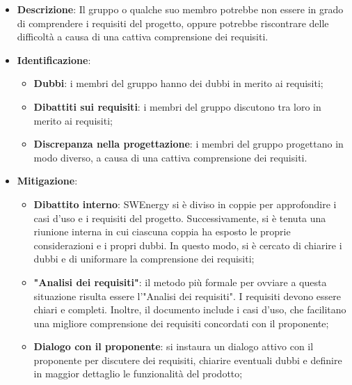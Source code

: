 \label{risk:comprensione dei requisiti carente}
\begin{itemize}
	\item \textbf{Descrizione}:
	      Il gruppo o qualche suo membro potrebbe non essere in grado di
	      comprendere i requisiti del progetto, oppure potrebbe riscontrare
	      delle difficoltà a causa di una cattiva comprensione dei requisiti.
	\item \textbf{Identificazione}:
	      \begin{itemize}
		      \item \textbf{Dubbi}: i membri del gruppo hanno dei dubbi in merito ai
		            requisiti;

		      \item \textbf{Dibattiti sui requisiti}: i membri del gruppo
		            discutono tra loro in merito ai requisiti;

		      \item \textbf{Discrepanza nella progettazione}: i membri del
		            gruppo progettano in modo diverso, a causa di una cattiva
		            comprensione dei requisiti.
	      \end{itemize}

	\item \textbf{Mitigazione}:
	      \begin{itemize}
		      \item \textbf{Dibattito interno}: SWEnergy si è diviso in coppie
		            per approfondire i casi d'uso e i requisiti del progetto.
		            Successivamente, si è tenuta una riunione interna in cui ciascuna coppia
		            ha esposto  le proprie considerazioni e i propri dubbi. In
		            questo modo, si è cercato di chiarire i dubbi e di
		            uniformare la comprensione dei requisiti;

		      \item \textbf{"Analisi dei requisiti"}: il metodo più formale per
		            ovviare a questa situazione risulta essere
		            l'"Analisi dei requisiti".
		            I requisiti devono essere chiari e completi. Inoltre, il documento 
					include i casi d’uso, che facilitano una migliore comprensione 
					dei requisiti concordati con il proponente;

		      \item \textbf{Dialogo con il proponente}: si instaura un dialogo attivo 
			  con il proponente per discutere dei requisiti, chiarire eventuali dubbi 
			  e definire in maggior dettaglio le funzionalità del prodotto;


\end{itemize}
\end{itemize}
